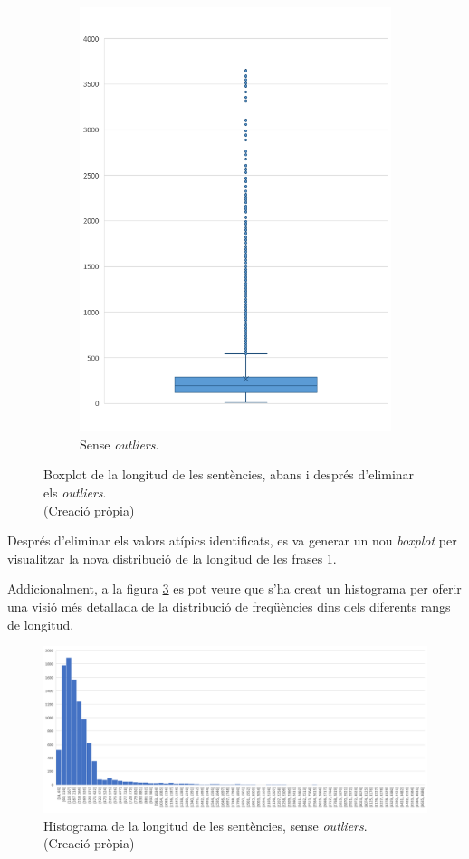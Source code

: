 \begin{figure}[H]
\begin{subfigure}{.5\textwidth}
    \includegraphics[width=.7\linewidth]{box_sent_out.png}
    \caption{Sense \textit{outliers}.}
    \label{fig:box_longitud_sentencies_out}
  \end{subfigure}
  \caption[Boxplot de la longitud de les sentències]{Boxplot de la longitud de les sentències, abans i després d'eliminar els \textit{outliers}. \\ (Creació pròpia)}
  \label{fig:box_longitud_sentencies}
\end{figure}

Després d'eliminar els valors atípics identificats, es va generar un nou \textit{boxplot} per visualitzar la nova distribució de la longitud de les frases \ref{fig:box_longitud_sentencies_out}. 

Addicionalment, a la figura \ref{fig:histograma_sentencies_out} es pot veure que s'ha creat un histograma per oferir una visió més detallada de la distribució de freqüències dins dels diferents rangs de longitud.

\begin{figure}[H]
  \centering
  \includegraphics[width=\textwidth]{hist_sent_out.png}
  \caption[Histograma de la longitud de les sentències]{Histograma de la longitud de les sentències, sense \textit{outliers}. \\ (Creació pròpia)}
  \label{fig:histograma_sentencies_out}
\end{figure}


